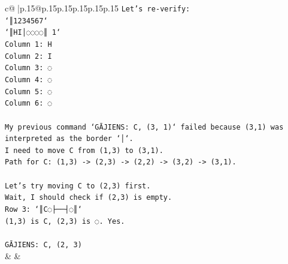 \documentclass{article}
\begin{document}
{\begin{supertabular}{c@{$\;$}|p{.15\linewidth}@{}p{.15\linewidth}p{.15\linewidth}p{.15\linewidth}p{.15\linewidth}p{.15\linewidth}}
{{{\texttt{Let's re{-}verify:} \\
\texttt{`║1234567`} \\
\texttt{`║HI│◌◌◌◌║ 1`} \\
\texttt{Column 1: H} \\
\texttt{Column 2: I} \\
\texttt{Column 3: ◌} \\
\texttt{Column 4: ◌} \\
\texttt{Column 5: ◌} \\
\texttt{Column 6: ◌} \\
\\ 
\texttt{My previous command `GĀJIENS: C, (3, 1)` failed because (3,1) was interpreted as the border `│`.} \\
\texttt{I need to move C from (1,3) to (3,1).} \\
\texttt{Path for C: (1,3) {-}> (2,3) {-}> (2,2) {-}> (3,2) {-}> (3,1).} \\
\\ 
\texttt{Let's try moving C to (2,3) first.} \\
\texttt{Wait, I should check if (2,3) is empty.} \\
\texttt{Row 3: `║C◌├──┤◌║`} \\
\texttt{(1,3) is C, (2,3) is ◌. Yes.} \\
\\ 
\texttt{GĀJIENS: C, (2, 3)} \\
            }
        }
    }
    & & \\ \\


\end{supertabular}}
\end{document}
